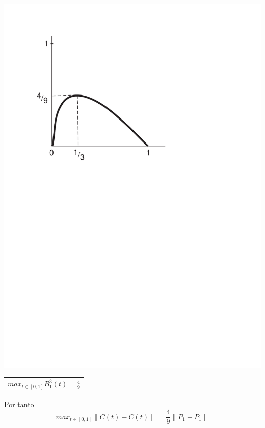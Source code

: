 \documentclass[ebook,oneside]{memoir}
\begin{document}
\begin{center}
\begin{minipage}{.2 \textwidth}
	\includegraphics[scale=0.2]{3_6.pdf}
\end{minipage}
\begin{minipage}{0.55 \textwidth}
\begin{tabular}{c} $max_{t\in[0,1]}B_1^3(t)=\frac{4}{9}$
\end{tabular}
\end{minipage}
\end{center}
Por tanto
$$max_{t\in[0,1]}\parallel C(t)-\overline{C}(t)\parallel
=\frac{4}{9}\parallel P_1-\overline{P}_1\parallel$$

\vspace{0.3cm}
\end{document}
